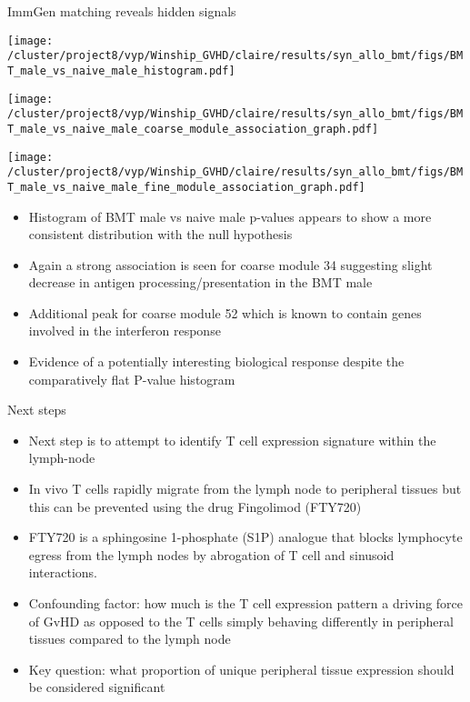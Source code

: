 \documentclass[final,hyperref={pdfpagelabels=false}]{beamer}
\begin{document}
\begin{frame}{}
\begin{columns}[t]
\begin{column}{.36\linewidth}
\begin{block}{ImmGen matching reveals hidden signals}
	\begin{minipage}{0.30\textwidth}
            \texttt{[image: /cluster/project8/vyp/Winship\_GVHD/claire/results/syn\_allo\_bmt/figs/BMT\_male\_vs\_naive\_male\_histogram.pdf]}
          \end{minipage}
	  \hfill
          \begin{minipage}{0.30\textwidth}
            \texttt{[image: /cluster/project8/vyp/Winship\_GVHD/claire/results/syn\_allo\_bmt/figs/BMT\_male\_vs\_naive\_male\_coarse\_module\_association\_graph.pdf]}
          \end{minipage}
	  \hfill
	  \begin{minipage}{0.30\textwidth}
            \texttt{[image: /cluster/project8/vyp/Winship\_GVHD/claire/results/syn\_allo\_bmt/figs/BMT\_male\_vs\_naive\_male\_fine\_module\_association\_graph.pdf]}
          \end{minipage}
	  \hfill
 {\small \begin{itemize}
	\item Histogram of BMT male vs naive male p-values appears to show a more consistent distribution with the null hypothesis
	\item Again a strong association is seen for coarse module 34 suggesting slight decrease in antigen processing/presentation in the BMT male
	\item Additional peak for coarse module 52 which is known to contain genes involved in the interferon response 
	\item Evidence of a potentially interesting biological response despite the comparatively flat P-value histogram 
	\end{itemize}}
        \end{block}




	\begin{block}{Next steps}
    {\small  \begin{itemize}
            \item Next step is to attempt to identify T cell expression signature within the lymph-node
	    \item In vivo T cells rapidly migrate from the lymph node to peripheral tissues but this can be prevented using the drug Fingolimod (FTY720) 
	     \item FTY720 is a sphingosine 1-phosphate (S1P) analogue that blocks lymphocyte egress from the lymph nodes by abrogation of T cell and sinusoid interactions.
	      \item Confounding factor: how much is the T cell expression pattern a driving force of GvHD as opposed to the T cells simply behaving differently in peripheral tissues compared to the lymph node
	      \item Key question: what proportion of unique peripheral tissue expression should be considered significant 
          \end{itemize}}
    \end{block}
	\end{column}
    \end{columns}
  \end{frame}
\end{document}
